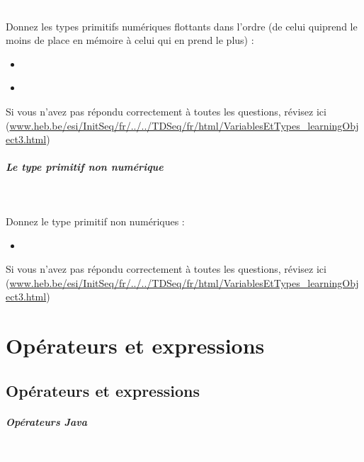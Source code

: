 \documentclass[11pt,a4paper]{article}
\begin{document}
                \textcolor{white}{.} \par
             
								Donnez les types primitifs num\'eriques flottants dans l'ordre (de celui quiprend le moins de place en m\'emoire \`a celui qui en prend le plus) :
							
					\begin{itemize}
				
			\item  \textcolor{gray}{\underline{\hspace*{3em}}} 
			\item  \textcolor{gray}{\underline{\hspace*{5em}}} 
					\end{itemize}
				Si vous n'avez pas r\'epondu correctement \`a toutes les questions, 
				    r\'evisez ici (\url{www.heb.be/esi/InitSeq/fr/../../TDSeq/fr/html/VariablesEtTypes\_learningObject3.html})
            \par
        
			
		\subparagraph{Le type primitif non num\'erique} 
		
                \textcolor{white}{.} \par
             
								Donnez le type primitif non num\'eriques :
							
					\begin{itemize}
				
			\item  \textcolor{gray}{\underline{\hspace*{5em}}} 
					\end{itemize}
				Si vous n'avez pas r\'epondu correctement \`a toutes les questions, 
          r\'evisez ici (\url{www.heb.be/esi/InitSeq/fr/../../TDSeq/fr/html/VariablesEtTypes\_learningObject3.html})
            \par
        \section{Op\'erateurs et expressions}\subsection{Op\'erateurs et expressions}
			
		\subparagraph{Op\'erateurs Java} 
		
                \textcolor{white}{.} \par
            
\end{document}
